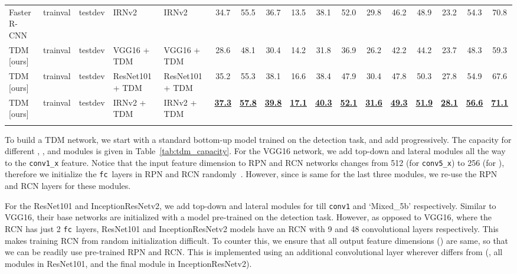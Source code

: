 \documentclass[10pt,twocolumn,letterpaper]{article}
\newcommand{\vv}[1]{{\texttt{#1}}}
\newcommand{\conv}{\vv{conv}}
\newcommand{\fc}{\vv{fc}}
\newcommand{\hl}[1]{\underline{\textbf{#1}}}
\begin{document}
\begin{table*}[th]
{\begin{tabular}{
@{}o{2.7cm} o{1.3cm} o{1.3cm} o{2.5cm} o{2.5cm} 
!{\color{gray}\vrule} ccc
!{\color{gray}\vrule} ccc
!{\color{gray}\vrule} ccc
!{\color{gray}\vrule} ccc
@{}}
Faster R-CNN & trainval\raisebox{0.2ex}{} & testdev & IRNv2 & IRNv2 & 34.7 & 55.5 & 36.7 & 13.5 & 38.1 & 52.0 & 29.8 & 46.2 & 48.9 & 23.2 & 54.3 & 70.8 \\
\Xhline{1pt}
TDM [ours]  & trainval\raisebox{0.2ex}{} & testdev & VGG16 + TDM & VGG16 + TDM & 28.6 &  48.1 &  30.4 &  14.2 &  31.8 &  36.9 &  26.2 &  42.2 &  44.2 &  23.7 &  48.3 &  59.3 \\
TDM [ours]  & trainval\raisebox{0.2ex}{} & testdev & ResNet101 + TDM & ResNet101 + TDM & 35.2 & 55.3 & 38.1 & 16.6 & 38.4 & 47.9 & 30.4 & 47.8 & 50.3 & 27.8 & 54.9 & 67.6 \\
TDM [ours]  & trainval\raisebox{0.2ex}{} & testdev & IRNv2 + TDM & IRNv2 + TDM & \hl{37.3} & \hl{57.8} & \hl{39.8} & \hl{17.1} & \hl{40.3} & \hl{52.1} & \hl{31.6} & \hl{49.3} & \hl{51.9} & \hl{28.1} & \hl{56.6} & \hl{71.1} \\
\Xhline{1pt}
\end{tabular}
}
\vspace{-0.11in}
\label{tab:coco_pref}
\end{table*}


To build a TDM network, we start with a standard bottom-up model trained on the detection task, and add  progressively. The capacity for different , , and  modules is given in Table~\ref{tab:tdm_capacity}. For the VGG16 network, we add top-down and lateral modules all the way to the \conv\verb|1_x| feature. Notice that the input feature dimension to RPN and RCN networks changes from 512 (for \conv\verb|5_x|) to 256 (for ), therefore we initialize the \fc\ layers in RPN and RCN randomly~\cite{xavier}. However, since  is same for the last three  modules, we re-use the RPN and RCN layers for these modules.

For the ResNet101 and InceptionResNetv2, we add top-down and lateral modules for till \conv\verb|1| and `Mixed\_5b' respectively. Similar to VGG16, their base networks are initialized with a model pre-trained on the detection task. However, as opposed to VGG16, where the RCN has just 2 \fc\ layers, ResNet101 and InceptionResNetv2 models have an RCN with 9 and 48 convolutional layers respectively. This makes training RCN from random initialization difficult. To counter this, we ensure that all  output feature dimensions () are same, so that we can be readily use pre-trained RPN and RCN. This is implemented using an additional  convolutional layer wherever  differs from  (\eg, all  modules in ResNet101, and the final  module in InceptionResNetv2).
\end{document}
